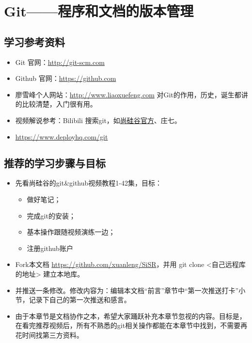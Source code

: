 






\chapter{Git——程序和文档的版本管理}
\section{学习参考资料}
\begin{itemize}
\item Git 官网：\url{http://git-scm.com}

\item Github 官网：\url{https://github.com}

\item 廖雪峰个人网站：\url{http://www.liaoxuefeng.com} 对Git的作用，历史，诞生都讲的比较清楚，入门很有用。

\item 视频解说参考：Bilibili 搜索git，如\href{https://www.bilibili.com/video/BV1pW411A7a5?from=search&seid=3815767452396308043}{尚硅谷官方}、庄七。

\item \url{https://www.deployhq.com/git}
\end{itemize}


\section{推荐的学习步骤与目标}
\begin{itemize}
\item 先看尚硅谷的git\&github视频教程1-42集，目标：
	\begin{itemize}
	\item 做好笔记；
	\item 完成git的安装；
	\item 基本操作跟随视频演练一边；
	\item 注册github账户
 	\end{itemize}
\item Fork本文档 \url{https://github.com/xuanleng/SiSR}，并用 git clone <自己远程库的地址> 建立本地库。
\item 并推送一条修改。修改内容为：编辑本文档“前言”章节中“第一次推送打卡”小节，记录下自己的第一次推送和感言。
\item 由于本章节是文档协作之本，希望大家踊跃补充本章节忽视的内容。目标是，在看完推荐视频后，所有不熟悉的git相关操作都能在本章节中找到，不需要再花时间找第三方资料。
\end{itemize}


